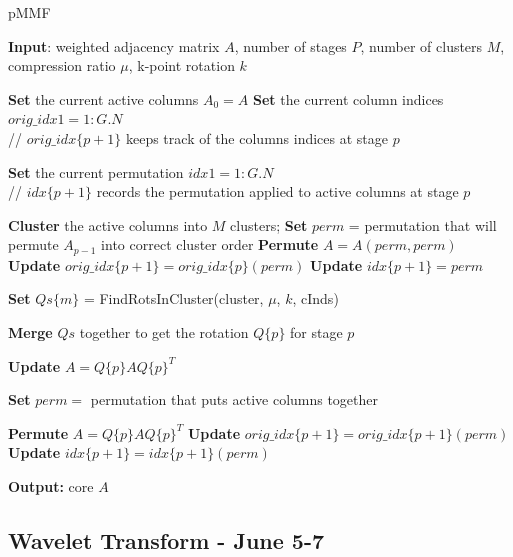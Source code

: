 \documentclass[a4paper]{article}
\begin{document}
\begin{algorithm}[H]
\caption{pMMF}\label{pmmf}
\begin{algorithmic}[1]
\State \textbf{Input}: weighted adjacency matrix $A$, number of stages $P$, number of clusters $M$, compression ratio $\mu$, k-point rotation $k$

\medskip
\State \textbf{Set} the current active columns $A_0 = A$
\State \textbf{Set} the current column indices $orig\_idx{1} = 1:G.N$
\\ \quad\quad // $orig\_idx\{p+1\}$ keeps track of the columns indices at stage $p$ 

\State \textbf{Set} the current permutation $idx{1} = 1:G.N$
\\ \quad\quad // $idx\{p+1\}$ records the permutation applied to active columns at stage $p$ 

\medskip
{}

\State \textbf{Cluster} the active columns into $M$ clusters;
\State \textbf{Set} $perm$ = permutation that will permute $A_{p-1}$ into correct cluster order
\State \textbf{Permute}  $A = A(perm, perm)$
\State \textbf{Update} $orig\_idx\{p+1\} = orig\_idx\{p\}(perm)$ 
\State \textbf{Update} $idx\{p+1\} = perm$

\medskip
{}
\State \textbf{Set} $Qs\{m\}$ = FindRotsInCluster(cluster, $\mu$, $k$, cInds)
\EndFor

\medskip
\State \textbf{Merge} $Qs$ together to get the rotation $Q\{p\}$ for stage $p$

\State \textbf{Update} $A = Q\{p\}AQ\{p\}^T$

\State \textbf{Set} $perm =$ permutation that puts active columns together
 
\State \textbf{Permute} $A = Q\{p\}AQ\{p\}^T$
\State \textbf{Update} $orig\_idx\{p+1\} = orig\_idx\{p+1\}(perm)$
\State \textbf{Update} $idx\{p+1\} = idx\{p+1\}(perm)$

\EndFor

\State \textbf{Output:} core $A$

\end{algorithmic}
\end{algorithm}





\subsection{Wavelet Transform - June 5-7}
\end{document}
